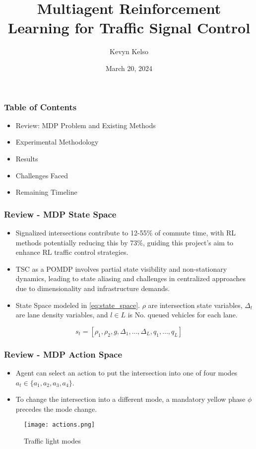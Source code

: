 \documentclass[compress,12pt]{beamer}
\title{Multiagent Reinforcement Learning for Traffic Signal Control}
\date{March 20, 2024}
\author{Kevyn Kelso}
\institute{University of Colorado at Colorado Springs}
\begin{document}
\frame[plain]{\titlepage}


\begin{frame}[bg=arguelles.png]
      \frametitle{Table of Contents}
      \begin{itemize}
      \item Review: MDP Problem and Existing Methods
      \item Experimental Methodology
      \item Results
      \item Challenges Faced
      \item Remaining Timeline
      \end{itemize}
\end{frame}


\begin{frame}[bg=arguelles.png]
      \frametitle{Review - MDP State Space}
      \begin{itemize}
      \item Signalized intersections contribute to 12-55\% of commute time, with RL methods potentially reducing this by 73\%, guiding this project's aim to enhance RL traffic control strategies.
      \item TSC as a POMDP involves partial state visibility and non-stationary dynamics, leading to state aliasing and challenges in centralized approaches due to dimensionality and infrastructure demands.
      \item State Space modeled in \ref{eq:state_space}. \(\rho\) are intersection state variables, \(\Delta_l\) are lane density variables, and \(l \in L\) is No. queued vehicles for each lane.
      \end{itemize}

\begin{equation}
s_t = [\rho_1, \rho_2, g, \Delta_1, \ldots, \Delta_L, q_1, \ldots, q_L]
\label{eq:state_space}
\end{equation}
\end{frame}


\begin{frame}[bg=arguelles.png]
      \frametitle{Review - MDP Action Space}
      \begin{itemize}
      \item Agent can select an action to put the intersection into one of four modes \(a_t \in \{a_1, a_2, a_3, a_4\}\).
      \item To change the intersection into a different mode, a mandatory yellow phase $\phi$ precedes the mode change.
      \end{itemize}

    \begin{figure}[htbp]
      \centering
      \texttt{[image: actions.png]}
      \caption{Traffic light modes}
      \label{fig:action_space}
    \end{figure}
\end{frame}
\end{document}
